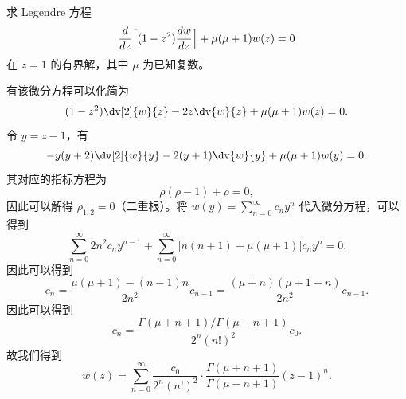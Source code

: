 \begin{question}
求 Legendre 方程
\[
\frac{d}{dz}\Bigl[(1-z^2)\frac{dw}{dz}\Bigr] + \mu(\mu+1) w(z)=0
\]
在 $z=1$ 的有界解，其中 $\mu$ 为已知复数。
\begin{solution}
有该微分方程可以化简为
\[
(1-z^2)\dv[2]{w}{z} - 2z\dv{w}{z} + \mu(\mu+1) w(z)=0.
\]
令 $y=z-1$，有
\[
-y(y+2)\dv[2]{w}{y} - 2(y+1)\dv{w}{y} + \mu(\mu+1) w(y)=0.
\]
其对应的指标方程为
\[
\rho(\rho-1) + \rho = 0,
\]
因此可以解得 $\rho_{1,2}=0$（二重根）。将 $w(y)=\sum_{n=0}^\infty c_n y^n$ 代入微分方程，可以得到
\[
\sum_{n=0}^\infty 2n^2 c_n y^{n-1} + \sum_{n=0}^\infty \bigl[n(n+1)-\mu(\mu+1)\bigr] c_n y^n =0.
\]
因此可以得到
\[
c_n = \frac{\mu(\mu+1)-(n-1)n}{2n^2} c_{n-1}
     = \frac{(\mu+n)(\mu+1-n)}{2n^2} c_{n-1}.
\]
因此可以得到
\[
c_n = \frac{\Gamma(\mu+n+1)/\Gamma(\mu-n+1)}{2^n (n!)^2} c_0.
\]
故我们得到
\[
w(z) = \sum_{n=0}^\infty \frac{c_0}{2^n (n!)^2} \cdot
       \frac{\Gamma(\mu+n+1)}{\Gamma(\mu-n+1)} (z-1)^n.
\]
\end{solution}
\end{question}

